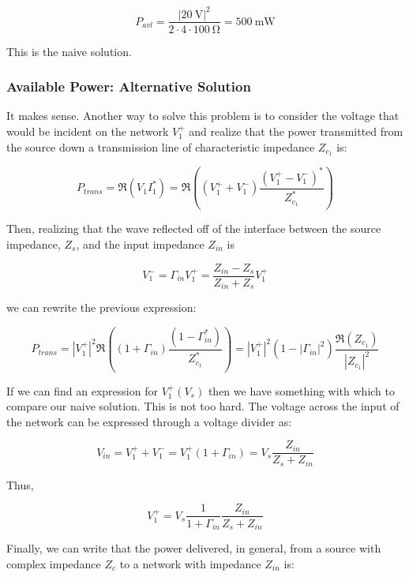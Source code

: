 \[ 
        P_{avl} = \frac{\left| \SI{20}{\volt} \right|^2}{2 \cdot 4 \cdot \SI{100}{\ohm}}
        = \SI{500}{\milli\watt}
\]

This is the naive solution. 

\subsubsection{Available Power: Alternative Solution}
It makes sense. Another way to solve this problem is to consider the voltage
that would be incident on the network $V_1^+$ and realize that the power
transmitted from the source down a transmission line of characteristic impedance $Z_{c_1}$ is:

\begin{equation*}
    P_{trans} = \Re \left( V_1 I_1^* \right) = \Re \left( \left(  V_1^+ + V_1^- \right) \frac{\left( V_1^+ - V_1^-
        \right)^*}{Z_{c_1}^*} \right) 
\end{equation*}

Then, realizing that the wave reflected off of the interface between the source
impedance, $Z_s$, and the input impedance $Z_{in}$ is

\[ 
        V_1^- = \Gamma_{in} V_1^+ = \frac{Z_{in} - Z_{s}}{Z_{in} + Z_{s}} V_1^+
\]

we can rewrite the previous expression:

\begin{equation}
    P_{trans}= \left| V_1^+ \right|^2 \Re \left( \left( 1  + \Gamma_{in} \right)
        \frac{\left(1 - \Gamma_{in}^* \right)}{Z_{c_1}^*} \right) = \left| V_1^+
        \right|^2 \left( 1-\left| \Gamma_{in} \right|^2 \right) \frac{\Re \left(
    Z_{c_1} \right)}{\left| Z_{c_1} \right|^2}
\end{equation}

If we can find an expression for $V_1^+(V_s)$ then we have something with which
to compare our naive solution. This is not too hard. The voltage across the
input of the network can be expressed through a voltage divider as:

\[ 
        V_{in} = V_1^+ + V_1^- = V_1^+ (1 + \Gamma_{in}) = V_s \frac{Z_{in}}{Z_s
        + Z_{in} }
\]

Thus,

\[ 
        V_1^+ = V_s\frac{1}{1+ \Gamma_{in}} \frac{Z_{in}}{Z_s + Z_{in}}
\]

Finally, we can write that the power delivered, in general, from a source with
complex impedance $Z_c$ to a network with impedance $Z_{in}$ is:

